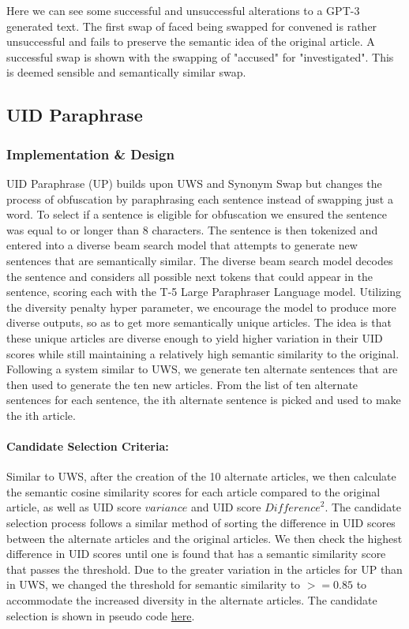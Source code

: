 \documentclass{article}
\begin{document}
\hfill \break Here we can see some successful and unsuccessful alterations to a GPT-3 generated text. The first swap of faced being swapped for convened is rather unsuccessful and fails to preserve the semantic idea of the original article. A successful swap is shown with the swapping of "accused" for "investigated". This is deemed sensible and semantically similar swap.

\subsection{UID Paraphrase}
\subsubsection{Implementation \& Design}
UID Paraphrase (UP) builds upon UWS and Synonym Swap but changes the process of obfuscation by paraphrasing each sentence instead of swapping just a word. To select if a sentence is eligible for obfuscation we ensured the sentence was equal to or longer than 8 characters. The sentence is then tokenized and entered into a diverse beam search model that attempts to generate new sentences that are semantically similar.
The diverse beam search model decodes the sentence and considers all possible next tokens that could appear in the sentence, scoring each with the T-5 Large Paraphraser Language model. Utilizing the diversity penalty hyper parameter, we encourage the model to produce more diverse outputs, so as to get more semantically unique articles. The idea is that these unique articles are diverse enough to yield higher variation in their UID scores while still maintaining a relatively high semantic similarity to the original.
Following a system similar to UWS, we generate ten alternate sentences that are then used to generate the ten new articles. From the list of ten alternate sentences for each sentence, the ith alternate sentence is picked and used to make the ith article.

\paragraph{Candidate Selection Criteria:} Similar to UWS, after the creation of the 10 alternate articles, we then calculate the semantic cosine similarity scores for each article compared to the original article, as well as UID score $variance$ and UID score ${Difference}^2$. The candidate selection process follows a similar method of sorting the difference in UID scores between the alternate articles and the original articles. We then check the highest difference in UID scores until one is found that has a semantic similarity score that passes the threshold. Due to the greater variation in the articles for UP than in UWS, we changed the threshold for semantic similarity to $>= 0.85$ to accommodate the increased diversity in the alternate articles. The candidate selection is shown in pseudo code \hyperlink{pseudo}{here}.
\end{document}
